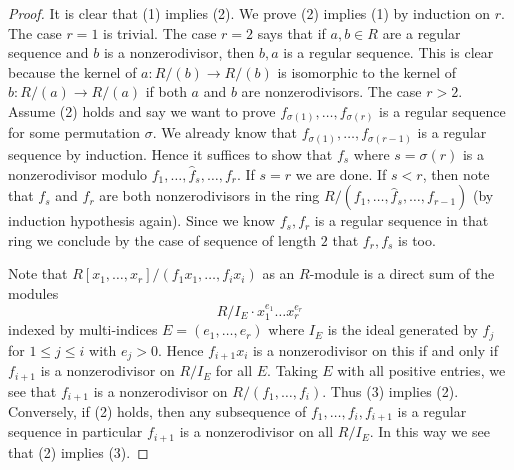 \begin{proof}
	It is clear that (1) implies (2). We prove (2) implies (1) by induction
	on $r$. The case $r = 1$ is trivial. The case $r = 2$ says that if
	$a, b \in R$ are a regular sequence and $b$ is a nonzerodivisor, then
	$b, a$ is a regular sequence. This is clear because the kernel of
	$a : R/(b) \to R/(b)$ is isomorphic to the kernel of $b : R/(a) \to R/(a)$
	if both $a$ and $b$ are nonzerodivisors. The case $r > 2$. Assume
	(2) holds and say we want to prove $f_{\sigma(1)}, \ldots, f_{\sigma(r)}$
	is a regular sequence for some permutation $\sigma$. We already know
	that $f_{\sigma(1)}, \ldots, f_{\sigma(r - 1)}$ is a regular sequence
	by induction. Hence it suffices to show that $f_s$ where $s = \sigma(r)$
	is a nonzerodivisor modulo $f_1, \ldots, \hat f_s, \ldots, f_r$.
	If $s = r$ we are done. If $s < r$, then note that $f_s$ and $f_r$
	are both nonzerodivisors in the ring
	$R/(f_1, \ldots, \hat f_s, \ldots, f_{r - 1})$
	(by induction hypothesis again). Since we know $f_s, f_r$ is a
	regular sequence in that ring we conclude by the case of sequence of length
	$2$ that $f_r, f_s$ is too.
	
	\medskip\noindent
	Note that $R[x_1, \ldots, x_r]/(f_1x_1, \ldots, f_ix_i)$ as an $R$-module
	is a direct sum of the modules
	$$
	R/I_E \cdot x_1^{e_1} \ldots x_r^{e_r}
	$$
	indexed by multi-indices $E = (e_1, \ldots, e_r)$ where
	$I_E$ is the ideal generated by $f_j$ for $1 \leq j \leq i$
	with $e_j > 0$. Hence $f_{i + 1}x_i$ is a nonzerodivisor on this if
	and only if $f_{i + 1}$ is a nonzerodivisor on $R/I_E$ for all $E$.
	Taking $E$ with all positive entries, we see that $f_{i + 1}$
	is a nonzerodivisor on $R/(f_1, \ldots, f_i)$. Thus (3) implies (2).
	Conversely, if (2) holds, then any subsequence of
	$f_1, \ldots, f_i, f_{i + 1}$ is a regular sequence
	in particular $f_{i + 1}$ is a nonzerodivisor on all $R/I_E$.
	In this way we see that (2) implies (3).
\end{proof}
